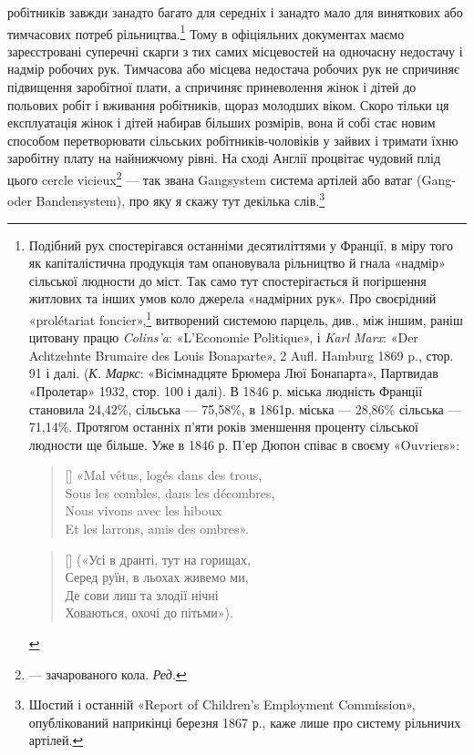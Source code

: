 робітників завжди занадто багато для середніх і занадто мало для
виняткових або тимчасових потреб рільництва.\footnote{
Подібний рух спостерігався останніми десятиліттями у Франції,
в міру того як капіталістична продукція там опановувала рільництво й
гнала «надмір» сільської людности до міст. Так само тут спостерігається
й погіршення житлових та інших умов коло джерела «надмірних рук».
Про своєрідний «prolétariat foncier»,\footnote*{
— сільський пролетаріят. \emph{Ред.}
} витворений системою парцель, див.,
між іншим, раніш цитовану працю \emph{Colins’a}: «L’Economie Politique», і
\emph{Karl Marx}: «Der Achtzehnte Brumaire des Louis Bonaparte», 2 Aufl.
Hamburg 1869 p., стор. 91 і далі. (\emph{К. Маркс}: «Вісімнадцяте Брюмера Люї
Бонапарта», Партвидав «Пролетар» 1932, стор. 100 і далі). В 1846 р.
міська людність Франції становила 24,42\%, сільська — 75,58\%, в 1861р.
міська — 28,86\% сільська — 71,14\%. Протягом останніх п’яти років
зменшення проценту сільської людности ще більше. Уже в 1846 р. П’ер
Дюпон співає в своєму «Ouvriers»:

\settowidth{\versewidth}{Sous les combles, dans les décombres,}
\begin{verse}[\versewidth]
«Mal vêtus, logés dans des trous,\\
Sous les combles, dans les décombres,\\
Nous vivons avec les hiboux\\
Et les larrons, amis des ombres».
\end{verse}

\settowidth{\versewidth}{Де сови лиш та злодії нічні}
\begin{verse}[\versewidth]
(«Усі в дранті, тут на горищах,\\
Серед руїн, в льохах живемо ми,\\
Де сови лиш та злодії нічні\\
Ховаються, охочі до пітьми»).\\
\end{verse}
} Тому в офіціяльних
документах маємо зареєстровані суперечні скарги з
тих самих місцевостей на одночасну недостачу і надмір робочих
рук. Тимчасова або місцева недостача робочих рук не спричиняє
підвищення заробітної плати, а спричиняє приневолення жінок
і дітей до польових робіт і вживання робітників, щораз молодших
віком. Скоро тільки ця експлуатація жінок і дітей набирав
більших розмірів, вона й собі стає новим способом перетворювати
сільських робітників-чоловіків у зайвих і тримати їхню
заробітну плату на найнижчому рівні. На сході Англії процвітає
чудовий плід цього cercle vicieux\footnote*{
— зачарованого кола. \emph{Ред.}
} — так звана Gangsystem
система артілей або ватаг (Gang-oder Bandensystem), про яку
я скажу тут декілька слів.\footnote{
Шостий і останній «Report of Children’s Employment Commission»,
опублікований наприкінці березня 1867 р., каже лише про систему
рільничих артілей.
}

